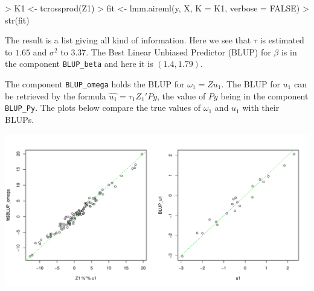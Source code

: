 \documentclass{article}
\renewenvironment{Schunk}{\vspace{\topsep}}{\vspace{\topsep}}
\begin{document}
\begin{Schunk}
\begin{Sinput}
> K1 <- tcrossprod(Z1)
> fit <- lmm.aireml(y, X, K = K1, verbose = FALSE)
> str(fit)
\end{Sinput}
\end{Schunk}

  The result is a list giving all kind of information. Here we see that $\tau$ is 
  estimated to $1.65$ and $\sigma^2$ to $3.37$. 
  The Best Linear Unbiased Predictor (BLUP) for $\beta$ is in the component \verb!BLUP_beta!
  and here it is $(1.4, 1.79)$.
  
  The component \verb!BLUP_omega! holds the BLUP for $\omega_1 = Z u_1$. The BLUP for $u_1$
  can be retrieved by the formula $ = \tau_1 Z_1' P y$, the value of $Py$ being
  in the component \verb!BLUP_Py!. The plots below compare the true values of $\omega_1$ and
  $u_1$ with their BLUPs.
   
\begin{center}
\begin{Schunk}
\end{Schunk}
\includegraphics{gaston-043}
\end{center}
\end{document}
